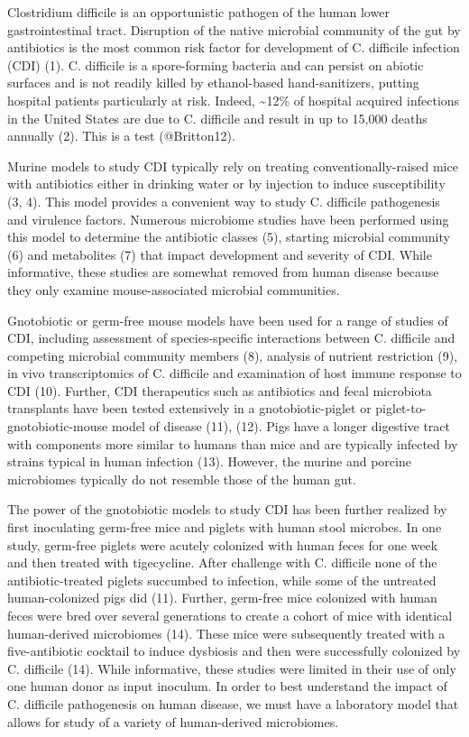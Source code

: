 \documentclass[]{article}
\begin{document}
Clostridium difficile is an opportunistic pathogen of the human lower
gastrointestinal tract. Disruption of the native microbial community of
the gut by antibiotics is the most common risk factor for development of
C. difficile infection (CDI) (1). C. difficile is a spore-forming
bacteria and can persist on abiotic surfaces and is not readily killed
by ethanol-based hand-sanitizers, putting hospital patients particularly
at risk. Indeed, \textasciitilde{}12\% of hospital acquired infections
in the United States are due to C. difficile and result in up to 15,000
deaths annually (2). This is a test (@Britton12).

Murine models to study CDI typically rely on treating
conventionally-raised mice with antibiotics either in drinking water or
by injection to induce susceptibility (3, 4). This model provides a
convenient way to study C. difficile pathogenesis and virulence factors.
Numerous microbiome studies have been performed using this model to
determine the antibiotic classes (5), starting microbial community (6)
and metabolites (7) that impact development and severity of CDI. While
informative, these studies are somewhat removed from human disease
because they only examine mouse-associated microbial communities.

Gnotobiotic or germ-free mouse models have been used for a range of
studies of CDI, including assessment of species-specific interactions
between C. difficile and competing microbial community members (8),
analysis of nutrient restriction (9), in vivo transcriptomics of C.
difficile and examination of host immune response to CDI (10). Further,
CDI therapeutics such as antibiotics and fecal microbiota transplants
have been tested extensively in a gnotobiotic-piglet or
piglet-to-gnotobiotic-mouse model of disease (11), (12). Pigs have a
longer digestive tract with components more similar to humans than mice
and are typically infected by strains typical in human infection (13).
However, the murine and porcine microbiomes typically do not resemble
those of the human gut.

The power of the gnotobiotic models to study CDI has been further
realized by first inoculating germ-free mice and piglets with human
stool microbes. In one study, germ-free piglets were acutely colonized
with human feces for one week and then treated with tigecycline. After
challenge with C. difficile none of the antibiotic-treated piglets
succumbed to infection, while some of the untreated human-colonized pigs
did (11). Further, germ-free mice colonized with human feces were bred
over several generations to create a cohort of mice with identical
human-derived microbiomes (14). These mice were subsequently treated
with a five-antibiotic cocktail to induce dysbiosis and then were
successfully colonized by C. difficile (14). While informative, these
studies were limited in their use of only one human donor as input
inoculum. In order to best understand the impact of C. difficile
pathogenesis on human disease, we must have a laboratory model that
allows for study of a variety of human-derived microbiomes.
\end{document}
